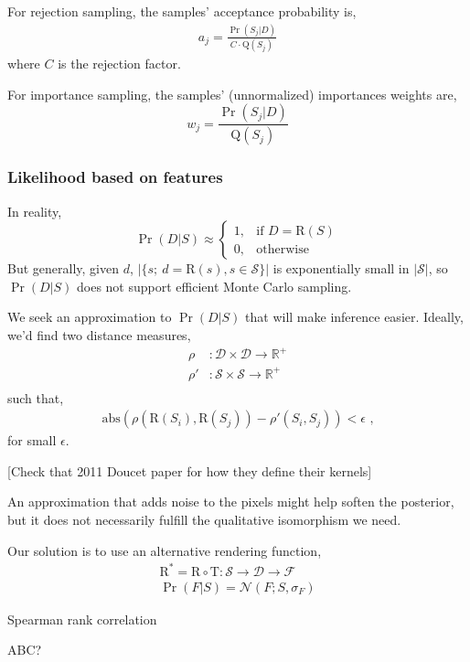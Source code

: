 \documentclass[]{report}
\begin{document}
For rejection sampling, the samples' acceptance probability is,
\begin{align*}
  a_j = \frac{\Pr(S_j | D)}{C \cdot \mathrm{Q}(S_j)}
\end{align*}
where $C$ is the rejection factor.

For importance sampling, the samples' (unnormalized) importances
weights are,
\[
w_j = \frac{\Pr(S_j | D)}{\mathrm{Q}(S_j)}
\]

\subsubsection*{Likelihood based on features}
In reality, 
\[
\Pr(D | S) \approx 
\begin{cases}
  1 , & \text{if } D = \mathrm{R}(S) \\
  0 , & \text{otherwise}
\end{cases}
\]
But generally, given $d$, $| \{s;\ d = \mathrm{R}(s), s \in
\mathcal{S} \} |$ is exponentially small in $|\mathcal{S}|$, so $\Pr(D
| S)$ does not support efficient Monte Carlo sampling.

We seek an approximation to $\Pr(D|S)$ that will make inference
easier.  Ideally, we'd find two distance measures,
\begin{align*}
  \rho & : \mathcal{D} \times \mathcal{D} \rightarrow \mathbb{R}^+ \\
  \rho' & : \mathcal{S} \times \mathcal{S} \rightarrow \mathbb{R}^+ \\
\end{align*}
such that,
\begin{align*}
  \mathrm{abs} \left( \rho(\mathrm{R}(S_i), \mathrm{R}(S_j)) -
    \rho'(S_i, S_j) \right) < \epsilon \text{ ,}
\end{align*}
for small $\epsilon$.

[Check that 2011 Doucet paper for how they define their kernels]

An approximation that adds noise to the pixels might help soften the
posterior, but it does not necessarily fulfill the qualitative
isomorphism we need.

Our solution is to use an alternative rendering function,
\begin{align*}
  \mathrm{R}^* = \mathrm{R} \circ \mathrm{T} : \mathcal{S} \rightarrow \mathcal{D} \rightarrow \mathcal{F}\\
  \Pr(F | S) = \mathcal{N}(F;S, \sigma_F)
\end{align*}

Spearman rank correlation

ABC?
\end{document}
